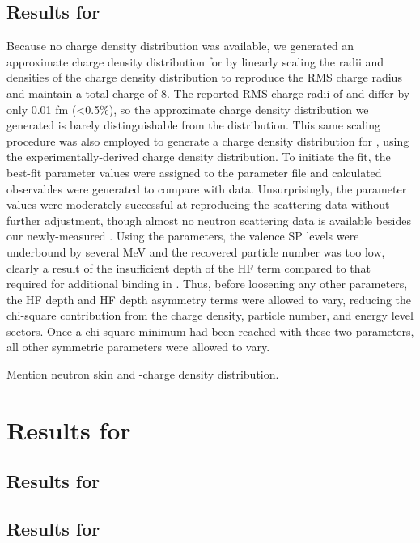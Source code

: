 \subsection{Results for \oEight}
Because no \oEight charge density distribution was available, we generated an approximate charge density
distribution for \oEight by linearly scaling
the radii and densities of the \oSix charge density distribution to reproduce the \oEight RMS charge
radius and maintain a total charge of 8. The reported RMS charge radii of \oSix and \oEight differ by only
0.01 fm (<0.5\%), so the approximate \oEight charge density distribution we generated is barely
distinguishable from the \oSix distribution. This same scaling procedure was also employed to
generate a charge density distribution for \snTwelve, using the
experimentally-derived \snFour charge density distribution. To initiate the fit, the \oSix best-fit parameter values
were assigned to the \oEight parameter file and calculated observables were generated to compare
with \oEight data. Unsurprisingly, the \oSix parameter values were moderately successful at reproducing
the \oEight scattering data without further adjustment, though almost no neutron scattering data is
available besides our newly-measured \tot. Using the \oSix parameters, the \oEight valence SP levels were underbound
by several MeV and the recovered particle number was too low, clearly a result of the insufficient
depth of the \oSix HF term compared to that required for additional binding in \oEight. Thus, before
loosening any other parameters, the HF depth and HF depth asymmetry terms were allowed to vary,
reducing the chi-square contribution from the charge density, particle number, and energy level
sectors. Once a chi-square minimum had been reached with these two parameters, all other symmetric parameters
were allowed to vary.

Mention neutron skin and \neEight-\oEight charge density distribution.

\section{Results for \niEightFour}

\subsection{Results for \niEight}
\subsection{Results for \niFour}


